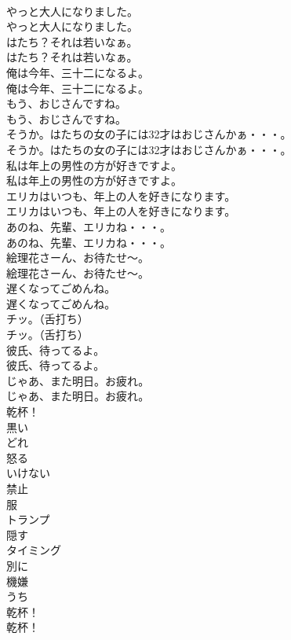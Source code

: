 \documentclass[8pt]{extreport}
\begin{document}
\begin{CJK}{UTF8}{min}
\\	やっと大人になりました。	
\\	やっと大人になりました。 
\\	はたち？それは若いなぁ。	
\\	はたち？それは若いなぁ。 
\\	俺は今年、三十二になるよ。	
\\	俺は今年、三十二になるよ。 
\\	もう、おじさんですね。	
\\	もう、おじさんですね。 
\\	そうか。はたちの女の子には32才はおじさんかぁ・・・。	
\\	そうか。はたちの女の子には32才はおじさんかぁ・・・。 
\\	私は年上の男性の方が好きですよ。	
\\	私は年上の男性の方が好きですよ。 
\\	エリカはいつも、年上の人を好きになります。	
\\	エリカはいつも、年上の人を好きになります。 
\\	あのね、先輩、エリカね・・・。	
\\	あのね、先輩、エリカね・・・。 
\\	絵理花さーん、お待たせ～。	
\\	絵理花さーん、お待たせ～。 
\\	遅くなってごめんね。	
\\	遅くなってごめんね。 
\\	チッ。（舌打ち）	
\\	チッ。（舌打ち） 
\\	彼氏、待ってるよ。	
\\	彼氏、待ってるよ。 
\\	じゃあ、また明日。お疲れ。	
\\	じゃあ、また明日。お疲れ。 
\\	乾杯！
\\	黒い
\\	どれ
\\	怒る
\\	いけない
\\	禁止
\\	服
\\	トランプ
\\	隠す
\\	タイミング
\\	別に
\\	機嫌
\\	うち
\\	乾杯！	
\\	乾杯！ 

\end{CJK}
\end{document}
